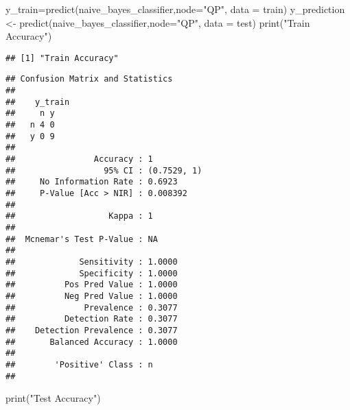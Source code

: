 \documentclass[
]{article}
\newenvironment{Shaded}{\begin{snugshade}}{\end{snugshade}}
\newcommand{\AttributeTok}[1]{\textcolor[rgb]{0.77,0.63,0.00}{#1}}
\newcommand{\FunctionTok}[1]{\textcolor[rgb]{0.00,0.00,0.00}{#1}}
\newcommand{\NormalTok}[1]{#1}
\newcommand{\OtherTok}[1]{\textcolor[rgb]{0.56,0.35,0.01}{#1}}
\newcommand{\SpecialCharTok}[1]{\textcolor[rgb]{0.00,0.00,0.00}{#1}}
\newcommand{\StringTok}[1]{\textcolor[rgb]{0.31,0.60,0.02}{#1}}
\begin{document}
\begin{Shaded}
\begin{Highlighting}[]
\NormalTok{y\_train}\OtherTok{=}\FunctionTok{predict}\NormalTok{(naive\_bayes\_classifier,}\AttributeTok{node=}\StringTok{"QP"}\NormalTok{, }\AttributeTok{data =}\NormalTok{ train)}
\NormalTok{y\_prediction }\OtherTok{\textless{}{-}} \FunctionTok{predict}\NormalTok{(naive\_bayes\_classifier,}\AttributeTok{node=}\StringTok{"QP"}\NormalTok{, }\AttributeTok{data =}\NormalTok{ test)}
\FunctionTok{print}\NormalTok{(}\StringTok{"Train Accuracy"}\NormalTok{)}
\end{Highlighting}
\end{Shaded}

\begin{verbatim}
## [1] "Train Accuracy"
\end{verbatim}

\begin{Shaded}
\end{Shaded}

\begin{verbatim}
## Confusion Matrix and Statistics
## 
##    y_train
##     n y
##   n 4 0
##   y 0 9
##                                      
##                Accuracy : 1          
##                  95% CI : (0.7529, 1)
##     No Information Rate : 0.6923     
##     P-Value [Acc > NIR] : 0.008392   
##                                      
##                   Kappa : 1          
##                                      
##  Mcnemar's Test P-Value : NA         
##                                      
##             Sensitivity : 1.0000     
##             Specificity : 1.0000     
##          Pos Pred Value : 1.0000     
##          Neg Pred Value : 1.0000     
##              Prevalence : 0.3077     
##          Detection Rate : 0.3077     
##    Detection Prevalence : 0.3077     
##       Balanced Accuracy : 1.0000     
##                                      
##        'Positive' Class : n          
## 
\end{verbatim}

\begin{Shaded}
\begin{Highlighting}[]
\FunctionTok{print}\NormalTok{(}\StringTok{"Test Accuracy"}\NormalTok{)}
\end{Highlighting}
\end{Shaded}
\end{document}
